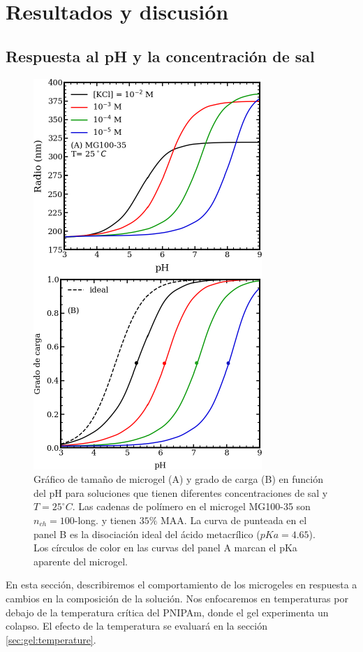 \section{Resultados y discusi\'on}



\subsection{Respuesta al pH y la concentraci\'on de sal}\label{sec:gel:pH_salt}


\begin{figure}[!ht]
\centering
\includegraphics[width=0.5\linewidth]{Figures/graph-gel/R-pH.pdf}
\caption{Gr\'afico de tama\~no de microgel (A) y grado de carga (B) en funci\'on del pH para soluciones que tienen diferentes concentraciones de sal y $T=25 ^\circ C$.
	Las cadenas de pol\'imero en el microgel MG100-35 son $n_{ch}=100$-long. y tienen $35\% $ MAA.
	La curva de  punteada en el panel B es la disociaci\'on ideal del \'acido metacr\'ilico ($pKa=4.65$).
	Los c\'irculos de color en las curvas del panel A marcan el pKa aparente del microgel.}
\label{fig:gel:R-pH}
\end{figure}

En esta secci\'on, describiremos el comportamiento de los microgeles en respuesta a cambios en la composici\'on de la soluci\'on. Nos enfocaremos en temperaturas por debajo de la temperatura cr\'itica del PNIPAm, donde el gel experimenta un colapso. El efecto de la temperatura se evaluar\'a en la secci\'on \ref{sec:gel:temperature}.

